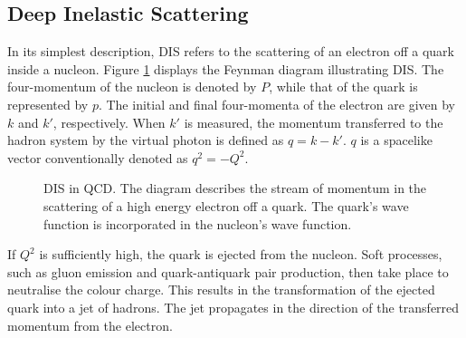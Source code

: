 \subsection{Deep Inelastic Scattering}
\label{10.10::deep_inelastic_scattering}
    In its simplest description, DIS refers to the scattering of an electron off a quark inside a nucleon.
    Figure \ref{fig::10.10::dis_diagram} displays the Feynman diagram illustrating DIS.
    The four-momentum of the nucleon is denoted by $P$, while that of the quark is represented by $p$.
    The initial and final four-momenta of the electron are given by $k$ and $k'$, respectively.
    When $k'$ is measured, the momentum transferred to the hadron system by the virtual photon is defined as $q = k - k'$.
    $q$ is a spacelike vector conventionally denoted as $q^2 = -Q^2$.

    \begin{figure}[h!]
        \caption[DIS in QCD.]
        {DIS in QCD.
        The diagram describes the stream of momentum in the scattering of a high energy electron off a quark.
        The quark's wave function is incorporated in the nucleon's wave function.}
        \label{fig::10.10::dis_diagram}
    \end{figure}

    If $Q^2$ is sufficiently high, the quark is ejected from the nucleon.
    Soft processes, such as gluon emission and quark-antiquark pair production, then take place to neutralise the colour charge.
    This results in the transformation of the ejected quark into a jet of hadrons.
    The jet propagates in the direction of the transferred momentum from the electron.

    
    
    
